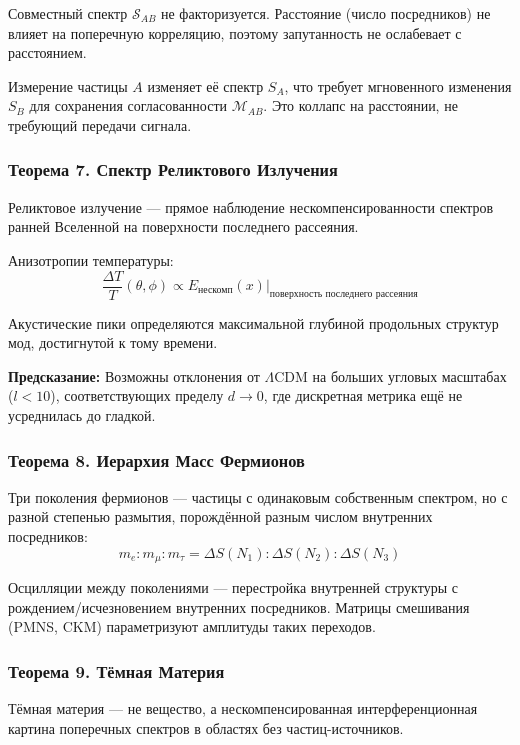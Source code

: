 \documentclass[12pt,a4paper]{article}
\begin{document}
Совместный спектр $\mathcal{S}_{AB}$ не факторизуется. Расстояние (число посредников) не влияет на поперечную корреляцию, поэтому запутанность не ослабевает с расстоянием.

Измерение частицы $A$ изменяет её спектр $S_A$, что требует мгновенного изменения $S_B$ для сохранения согласованности $\mathcal{M}_{AB}$. Это коллапс на расстоянии, не требующий передачи сигнала.

\subsubsection{Теорема 7. Спектр Реликтового Излучения}
Реликтовое излучение --- прямое наблюдение нескомпенсированности спектров ранней Вселенной на поверхности последнего рассеяния.

Анизотропии температуры:
\begin{equation}
    \frac{\Delta T}{T}(\theta, \phi) \propto E_{\text{нескомп}}(x)\big|_{\text{поверхность последнего рассеяния}}
\end{equation}

Акустические пики определяются максимальной глубиной продольных структур мод, достигнутой к тому времени.

\textbf{Предсказание:} Возможны отклонения от $\Lambda$CDM на больших угловых масштабах ($l < 10$), соответствующих пределу $d \to 0$, где дискретная метрика ещё не усреднилась до гладкой.

\subsubsection{Теорема 8. Иерархия Масс Фермионов}
Три поколения фермионов --- частицы с одинаковым собственным спектром, но с разной степенью размытия, порождённой разным числом внутренних посредников:
\begin{equation}
    m_e : m_\mu : m_\tau = \Delta S(N_1) : \Delta S(N_2) : \Delta S(N_3)
\end{equation}

Осцилляции между поколениями --- перестройка внутренней структуры с рождением/исчезновением внутренних посредников. Матрицы смешивания (PMNS, CKM) параметризуют амплитуды таких переходов.

\subsubsection{Теорема 9. Тёмная Материя}
Тёмная материя --- не вещество, а нескомпенсированная интерференционная картина поперечных спектров в областях без частиц-источников.
\end{document}
